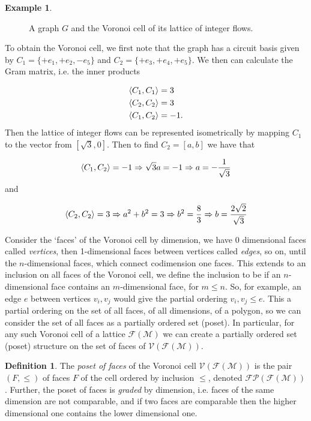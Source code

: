 \documentclass[12pt]{report}
\theoremstyle{definition}
\newtheorem{definition}[theorem]{Definition}
\newtheorem{example}[theorem]{Example}
\DeclarePairedDelimiter\iprod{\langle}{\rangle}
\def\calF{\mathcal F}
\def\calM{\mathcal M}
\def\calP{\mathcal P}
\def\calV{\mathcal V}
\theoremstyle{upright}
\begin{document}
\begin{example}
\begin{figure}[htbp]
\begin{center}
\begin{subfigure}[c]{0.45\linewidth}
            \end{subfigure}
    
        \end{center}
    
        \caption{A graph $G$ and the Voronoi cell of its lattice of integer flows.}\label{fig:VoronoiCell}
    
    \end{figure}

    To obtain the Voronoi cell, we first note that the graph has a circuit basis given by $C_1=\{+e_1, +e_2, -e_5\}$ and $C_2=\{+e_3, +e_4, +e_5\}$.
    We then can calculate the Gram matrix, i.e. the inner products

    \[\begin{aligned}
        \iprod*{C_1, C_1}&=3\\
        \iprod*{C_2, C_2}&=3\\
        \iprod*{C_1, C_2}&=-1.
    \end{aligned}\]
    Then the lattice of integer flows can be represented isometrically by mapping $C_1$ to the vector from $[\sqrt{3}, 0]$.
    Then to find $C_2=[a, b]$ we have that

    \[\iprod*{C_1, C_2}=-1\Rightarrow\sqrt{3}a=-1\Rightarrow a=-\frac{1}{\sqrt{3}}\]
    and

    \[\iprod*{C_2, C_2}=3\Rightarrow a^2+b^2=3\Rightarrow b^2=\frac{8}{3}\Rightarrow b=\frac{2\sqrt{2}}{\sqrt{3}}\]

\end{example}

Consider the `faces' of the Voronoi cell by dimension, we have 0 dimensional faces called \textit{vertices}, then 1-dimensional faces between vertices called \textit{edges}, so on, until the $n$-dimensional faces, which connect codimension one faces.
This extends to an inclusion on all faces of the Voronoi cell, we define the inclusion to be if an $n$-dimensional face contains an $m$-dimensional face, for $m\leq n$.
So, for example, an edge $e$ between vertices $v_i, v_j$ would give the partial ordering $v_i, v_j\leq e$.
This a partial ordering on the set of all faces, of all dimensions, of a polygon, so we can consider the set of all faces as a partially ordered set (poset).
In particular, for any such Voronoi cell of a lattice $\calF(\calM)$ we can create a partially ordered set (poset) structure on the set of faces of $\calV(\calF(\calM))$.

\begin{definition}

    The {\em poset of faces} of the Voronoi cell $\calV(\calF(\calM))$ is the pair $(F, \leq)$ of faces $F$ of the cell ordered by inclusion $\leq$, denoted $\calF\calP(\calF(\calM))$.
    Further, the poset of faces is {\em graded} by dimension, i.e. faces of the same dimension are not comparable, and if two faces are comparable then the higher dimensional one contains the lower dimensional one.

\end{definition}
\end{document}
